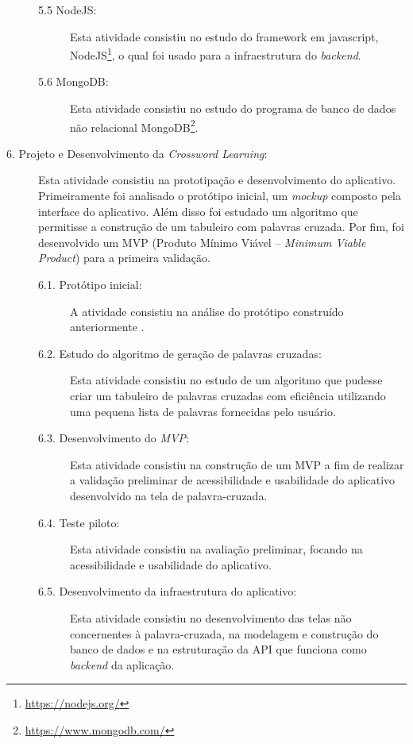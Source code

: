 \begin{description}
\begin{description}
\item[5.5 NodeJS:] Esta atividade consistiu no estudo do framework em javascript, NodeJS\footnote{\url{https://nodejs.org/}}, o qual foi usado para a infraestrutura do \textit{backend}.

\item[5.6 MongoDB:] Esta atividade consistiu no estudo do programa de banco de dados não relacional MongoDB\footnote{\url{https://www.mongodb.com/}}.

\end{description}

\item[6. Projeto e Desenvolvimento da \textit{Crossword Learning}:]
Esta atividade consistiu na prototipação e desenvolvimento do aplicativo. Primeiramente foi analisado o protótipo inicial, um \textit{mockup} composto pela interface do aplicativo. Além disso foi estudado um algoritmo que permitisse a construção de um tabuleiro com palavras cruzada. Por fim, foi desenvolvido um MVP (Produto Mínimo Viável -- \textit{Minimum Viable Product})  para a primeira validação.

\begin{description}
    \item[6.1. Protótipo inicial:]
    A atividade consistiu na análise do protótipo construído anteriormente \citep{oliveira2018crossword}.
    
    \item[6.2. Estudo do algoritmo de geração de palavras cruzadas:]
    Esta atividade consistiu no estudo de um algoritmo que pudesse criar um tabuleiro de palavras cruzadas com eficiência utilizando uma pequena lista de palavras fornecidas pelo usuário.
    
    \item[6.3. Desenvolvimento do \textit{MVP}:] 
    Esta atividade consistiu na construção de um MVP a fim de realizar a validação preliminar de acessibilidade e usabilidade do aplicativo desenvolvido na tela de palavra-cruzada.
    
    \item[6.4. Teste piloto:] 
    Esta atividade consistiu na avaliação preliminar, focando na acessibilidade e usabilidade do aplicativo.
    
    \item[6.5. Desenvolvimento da infraestrutura do aplicativo:] 
    Esta atividade consistiu no desenvolvimento das telas não concernentes à palavra-cruzada, na modelagem e construção do banco de dados e na estruturação da API que funciona como \textit{backend} da aplicação.
    

\end{description}
\end{description}

